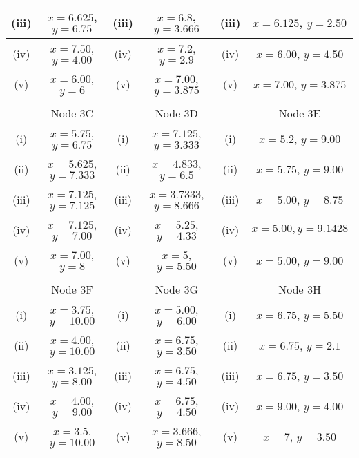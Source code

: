 \documentclass[a4paper,12pt]{article}
\begin{document}
\begin{tabular}{||c|c||c|c||c|c||}
		\hline (iii) & $x= 6.625$, $y= 6.75$  & (iii) & $x= 6.8$, $y =3.666 $ &(iii) & $x= 6.125$, $y= 2.50$ \\  \hline
		\hline (iv)  & $x= 7.50$, $y= 4.00$  & (iv) & $x= 7.2$, $y = 2.9$ & (iv)  & $x= 6.00$, $y= 4.50$\\  \hline
		\hline (v) & $x= 6.00$, $y= 6$ & (v) & $x= 7.00$, $y= 3.875$  &(v) & $x= 7.00$, $y= 3.875$\\  \hline & & & & & \\
		\hline 
		\hline  & Node 3C &   & Node 3D &  & Node 3E  \\  \hline
		\hline (i) & $x= 5.75$, $y= 6.75$ &  (i) & $x= 7.125$, $y = 3.333$  & (i)  & $x= 5.2$, $y= 9.00$\\  \hline
		\hline (ii) & $x= 5.625$, $y= 7.333$  & (ii) & $x= 4.833$, $y =6.5 $ &(ii) & $x= 5.75$, $y= 9.00$ \\  \hline
		\hline (iii)  & $x= 7.125$, $y= 7.125$  & (iii) & $x= 3.7333$, $y = 8.666$ & (iii)  & $x= 5.00$, $y= 8.75$\\  \hline
		\hline (iv)  & $x= 7.125$, $y = 7.00$  &  (iv) & $x= 5.25$, $y = 4.33$ & (iv) & $x= 5.00,  y = 9.1428$ \\  \hline
		\hline (v) & $x= 7.00$, $y= 8$ & (v) & $x= 5 $, $y= 5.50$  &(v) & $x= 5.00$, $y= 9.00$\\  \hline & & & & & \\
		\hline 
		\hline  &  Node 3F &  & Node 3G &   & Node 3H \\  \hline
		\hline (i) & $x= 3.75$, $y= 10.00$ & (i) & $x= 5.00$, $y = 6.00$  & (i)  & $x= 6.75$, $y= 5.50$\\  \hline
		\hline (ii)  & $x= 4.00$, $y = 10.00$  & (ii) & $x= 6.75 $, $y= 3.50$ & (ii) & $x= 6.75$, $y = 2.1$ \\  \hline
		\hline (iii) & $x= 3.125$, $y = 8.00 $   & (iii) & $x= 6.75$, $y= 4.50$ &(iii) & $x= 6.75$, $y= 3.50$ \\  \hline
		\hline (iv)  & $x= 4.00$, $y= 9.00$  & (iv) & $x= 6.75$, $y= 4.50$ & (iv)  & $x= 9.00 $, $y = 4.00$\\  \hline
		\hline (v) & $x= 3.5$, $y = 10.00$ & (v)  & $x= 3.666$, $y = 8.50 $ & (v) & $x= 7$, $y= 3.50$\\  \hline
		\hline 
		
	\end{tabular} 
\end{document}
